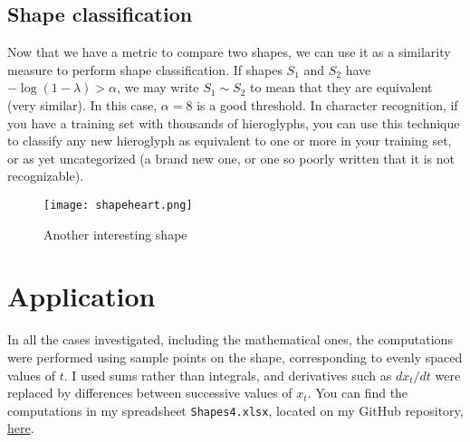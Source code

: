 \documentclass[oneside,10pt]{book}
\begin{document}
\subsection{Shape classification}

Now that we have a metric to compare two shapes, we can use it as a similarity measure to perform shape classification. If shapes $S_1$ and $S_2$ have
$-\log(1-\lambda)> \alpha$, we may write $S_1 \sim S_2$ to mean that they are equivalent (very similar). In this case, $\alpha=8$ is a good threshold. In character recognition, if you have a training set with thousands of hieroglyphs, you can use this technique to classify any new hieroglyph as equivalent to one or more in your training set, or as yet uncategorized (a brand new one, or one so poorly written that it is not recognizable). 

\begin{figure}%
\centering
\texttt{[image: shapeheart.png]} %
\caption{Another interesting shape}
\label{fig:34b}
\end{figure}

\section{Application}\label{s5}

In all the cases investigated, including the mathematical ones, the computations were performed using sample points on the shape, corresponding to evenly spaced values of $t$.  I used sums rather than integrals, and derivatives such as $dx_t/dt$ were replaced by differences between successive values of $x_t$. You can find the computations in my spreadsheet \texttt{Shapes4.xlsx}, located on my GitHub repository, \href{https://github.com/VincentGranville/Machine-Learning/blob/main/Spreadsheets/README.md}{here}.
\end{document}
